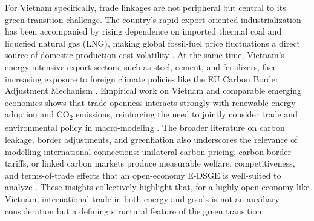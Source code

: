 \documentclass[12pt, a4paper]{article}
\begin{document}
	For Vietnam specifically, trade linkages are not peripheral but central to its green-transition challenge. The country's rapid export-oriented industrialization has been accompanied by rising dependence on imported thermal coal and liquefied natural gas (LNG), making global fossil-fuel price fluctuations a direct source of domestic production-cost volatility \citep{iea2023, gso2024}. At the same time, Vietnam's energy-intensive export sectors, such as steel, cement, and fertilizers, face increasing exposure to foreign climate policies like the EU Carbon Border Adjustment Mechanism \citep{ec2023}. Empirical work on Vietnam and comparable emerging economies shows that trade openness interacts strongly with renewable-energy adoption and CO\textsubscript{2} emissions, reinforcing the need to jointly consider trade and environmental policy in macro-modeling \citep{almulali2015, vo2020}. The broader literature on carbon leakage, border adjustments, and greenflation also underscores the relevance of modelling international connections: unilateral carbon pricing, carbon-border tariffs, or linked carbon markets produce measurable welfare, competitiveness, and terms-of-trade effects that an open-economy E-DSGE is well-suited to analyze \citep{fischer2012, bohringer2022}. These insights collectively highlight that, for a highly open economy like Vietnam, international trade in both energy and goods is not an auxiliary consideration but a defining structural feature of the green transition.
	
\end{document}
